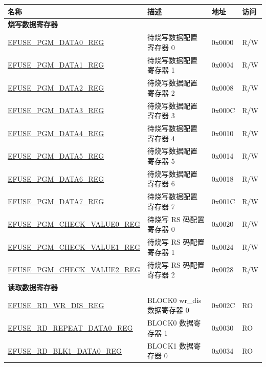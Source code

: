 \begin{longtable}{ | p{6cm} | p{7.2cm} | p{1.3cm} | p{1.5cm} | }
\hline\rowcolor{lightgray}
\textbf{名称} & \textbf{描述} & \textbf{地址} & \textbf{访问} \\ \hline
\endhead
\multicolumn{4}{|l|}{\textbf{烧写数据寄存器}} \\ \hline
\hyperref[regdesc:EFUSEPGMDATA0REG]{EFUSE\_PGM\_DATA0\_REG} & 待烧写数据配置寄存器 0 & 0x0000 & R/W \\ \hline
\hyperref[regdesc:EFUSEPGMDATA1REG]{EFUSE\_PGM\_DATA1\_REG} & 待烧写数据配置寄存器 1 & 0x0004 & R/W \\ \hline
\hyperref[regdesc:EFUSEPGMDATA2REG]{EFUSE\_PGM\_DATA2\_REG} & 待烧写数据配置寄存器 2 & 0x0008 & R/W \\ \hline
\hyperref[regdesc:EFUSEPGMDATA3REG]{EFUSE\_PGM\_DATA3\_REG} & 待烧写数据配置寄存器 3 & 0x000C & R/W \\ \hline
\hyperref[regdesc:EFUSEPGMDATA4REG]{EFUSE\_PGM\_DATA4\_REG} & 待烧写数据配置寄存器 4 & 0x0010 & R/W \\ \hline
\hyperref[regdesc:EFUSEPGMDATA5REG]{EFUSE\_PGM\_DATA5\_REG} & 待烧写数据配置寄存器 5 & 0x0014 & R/W \\ \hline
\hyperref[regdesc:EFUSEPGMDATA6REG]{EFUSE\_PGM\_DATA6\_REG} & 待烧写数据配置寄存器 6 & 0x0018 & R/W \\ \hline
\hyperref[regdesc:EFUSEPGMDATA7REG]{EFUSE\_PGM\_DATA7\_REG} & 待烧写数据配置寄存器 7 & 0x001C & R/W \\ \hline
\hyperref[regdesc:EFUSEPGMCHECKVALUE0REG]{EFUSE\_PGM\_CHECK\_VALUE0\_REG} & 待烧写 RS 码配置寄存器 0 & 0x0020 & R/W \\ \hline
\hyperref[regdesc:EFUSEPGMCHECKVALUE1REG]{EFUSE\_PGM\_CHECK\_VALUE1\_REG} & 待烧写 RS 码配置寄存器 1 & 0x0024 & R/W \\ \hline
\hyperref[regdesc:EFUSEPGMCHECKVALUE2REG]{EFUSE\_PGM\_CHECK\_VALUE2\_REG} & 待烧写 RS 码配置寄存器 2 & 0x0028 & R/W \\ \hline
\multicolumn{4}{|l|}{\textbf{读取数据寄存器}} \\ \hline
\hyperref[regdesc:EFUSERDWRDISREG]{EFUSE\_RD\_WR\_DIS\_REG} & BLOCK0 wr\_dis 数据寄存器 0 & 0x002C & RO \\ \hline
\hyperref[regdesc:EFUSERDREPEATDATA0REG]{EFUSE\_RD\_REPEAT\_DATA0\_REG} & BLOCK0 数据寄存器 1 & 0x0030 & RO \\ \hline
\hyperref[regdesc:EFUSERDBLK1DATA0REG]{EFUSE\_RD\_BLK1\_DATA0\_REG} & BLOCK1 数据寄存器 0 & 0x0034 & RO \\ \hline

\end{longtable}
